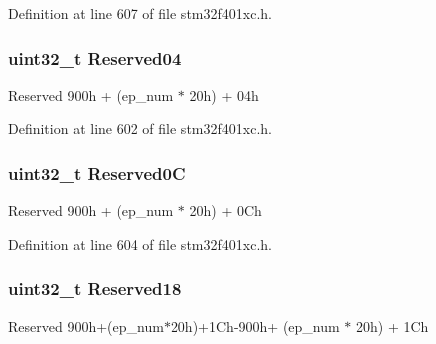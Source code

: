 Definition at line 607 of file stm32f401xc.\+h.

\subsubsection[{\texorpdfstring{Reserved04}{Reserved04}}]{\setlength{\rightskip}{0pt plus 5cm}uint32\+\_\+t Reserved04}\hypertarget{struct_u_s_b___o_t_g___i_n_endpoint_type_def_acfe7efaa61db86840767dff6d73f8695}{}\label{struct_u_s_b___o_t_g___i_n_endpoint_type_def_acfe7efaa61db86840767dff6d73f8695}
Reserved 900h + (ep\+\_\+num $\ast$ 20h) + 04h 

Definition at line 602 of file stm32f401xc.\+h.

\subsubsection[{\texorpdfstring{Reserved0C}{Reserved0C}}]{\setlength{\rightskip}{0pt plus 5cm}uint32\+\_\+t Reserved0C}\hypertarget{struct_u_s_b___o_t_g___i_n_endpoint_type_def_a1bcc039378b4ed4ac1261a0a758c3d1d}{}\label{struct_u_s_b___o_t_g___i_n_endpoint_type_def_a1bcc039378b4ed4ac1261a0a758c3d1d}
Reserved 900h + (ep\+\_\+num $\ast$ 20h) + 0\+Ch 

Definition at line 604 of file stm32f401xc.\+h.

\subsubsection[{\texorpdfstring{Reserved18}{Reserved18}}]{\setlength{\rightskip}{0pt plus 5cm}uint32\+\_\+t Reserved18}\hypertarget{struct_u_s_b___o_t_g___i_n_endpoint_type_def_a716e172ed03ae049eb501ad83207b4ed}{}\label{struct_u_s_b___o_t_g___i_n_endpoint_type_def_a716e172ed03ae049eb501ad83207b4ed}
Reserved 900h+(ep\+\_\+num$\ast$20h)+1\+Ch-\/900h+ (ep\+\_\+num $\ast$ 20h) + 1\+Ch 

